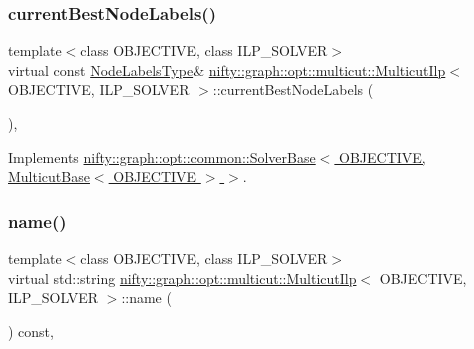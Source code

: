 \subsubsection{\texorpdfstring{current\+Best\+Node\+Labels()}{currentBestNodeLabels()}}
{\footnotesize\ttfamily template$<$class O\+B\+J\+E\+C\+T\+I\+VE, class I\+L\+P\+\_\+\+S\+O\+L\+V\+ER$>$ \\
virtual const \hyperlink{classnifty_1_1graph_1_1opt_1_1multicut_1_1MulticutIlp_a0e1396c7332495a1d4af41e5df69398b}{Node\+Labels\+Type}\& \hyperlink{classnifty_1_1graph_1_1opt_1_1multicut_1_1MulticutIlp}{nifty\+::graph\+::opt\+::multicut\+::\+Multicut\+Ilp}$<$ O\+B\+J\+E\+C\+T\+I\+VE, I\+L\+P\+\_\+\+S\+O\+L\+V\+ER $>$\+::current\+Best\+Node\+Labels (\begin{DoxyParamCaption}{ }\end{DoxyParamCaption})\hspace{0.3cm}{\ttfamily [inline]}, {\ttfamily [virtual]}}



Implements \hyperlink{classnifty_1_1graph_1_1opt_1_1common_1_1SolverBase_a7bbe01ee201cf3157b251e54c5ff0619}{nifty\+::graph\+::opt\+::common\+::\+Solver\+Base$<$ O\+B\+J\+E\+C\+T\+I\+V\+E, Multicut\+Base$<$ O\+B\+J\+E\+C\+T\+I\+V\+E $>$ $>$}.

\mbox{\label{classnifty_1_1graph_1_1opt_1_1multicut_1_1MulticutIlp_ae16cee89b02c93b4d2af91f39411411e}} 
\subsubsection{\texorpdfstring{name()}{name()}}
{\footnotesize\ttfamily template$<$class O\+B\+J\+E\+C\+T\+I\+VE, class I\+L\+P\+\_\+\+S\+O\+L\+V\+ER$>$ \\
virtual std\+::string \hyperlink{classnifty_1_1graph_1_1opt_1_1multicut_1_1MulticutIlp}{nifty\+::graph\+::opt\+::multicut\+::\+Multicut\+Ilp}$<$ O\+B\+J\+E\+C\+T\+I\+VE, I\+L\+P\+\_\+\+S\+O\+L\+V\+ER $>$\+::name (\begin{DoxyParamCaption}{ }\end{DoxyParamCaption}) const\hspace{0.3cm}{\ttfamily [inline]}, {\ttfamily [virtual]}}



